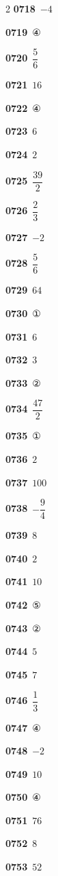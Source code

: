\documentclass[10pt,a4paper]{article}
\begin{document}
\begin{multicols}{2}
\noindent\textbf{0718}\ $-4$\par
\noindent\textbf{0719}\ ④\par
\noindent\textbf{0720}\ $\dfrac{5}{6}$\par
\noindent\textbf{0721}\ $16$\par
\noindent\textbf{0722}\ ④\par
\noindent\textbf{0723}\ $6$\par
\noindent\textbf{0724}\ $2$\par
\noindent\textbf{0725}\ $\dfrac{39}{2}$\par
\noindent\textbf{0726}\ $\dfrac{2}{3}$\par
\noindent\textbf{0727}\ $-2$\par
\noindent\textbf{0728}\ $\dfrac{5}{6}$\par
\noindent\textbf{0729}\ $64$\par
\noindent\textbf{0730}\ ①\par
\noindent\textbf{0731}\ $6$\par
\noindent\textbf{0732}\ $3$\par
\noindent\textbf{0733}\ ②\par
\noindent\textbf{0734}\ $\dfrac{47}{2}$\par
\noindent\textbf{0735}\ ①\par
\noindent\textbf{0736}\ $2$\par
\noindent\textbf{0737}\ $100$\par
\noindent\textbf{0738}\ $-\dfrac{9}{4}$\par
\noindent\textbf{0739}\ $8$\par
\noindent\textbf{0740}\ $2$\par
\noindent\textbf{0741}\ $10$\par
\noindent\textbf{0742}\ ⑤\par
\noindent\textbf{0743}\ ②\par
\noindent\textbf{0744}\ $5$\par
\noindent\textbf{0745}\ $7$\par
\noindent\textbf{0746}\ $\dfrac{1}{3}$\par
\noindent\textbf{0747}\ ④\par
\noindent\textbf{0748}\ $-2$\par
\noindent\textbf{0749}\ $10$\par
\noindent\textbf{0750}\ ④\par
\noindent\textbf{0751}\ $76$\par
\noindent\textbf{0752}\ $8$\par
\noindent\textbf{0753}\ $52$\par

\end{multicols}
\end{document}
